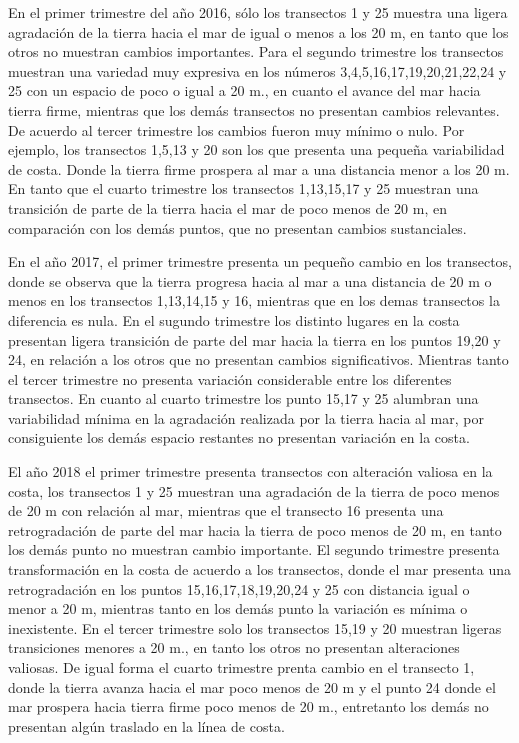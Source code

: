 \documentclass[11pt,]{article}
\begin{document}
En el primer trimestre del año 2016, sólo los transectos 1 y 25 muestra
una ligera agradación de la tierra hacia el mar de igual o menos a los
20 m, en tanto que los otros no muestran cambios importantes. Para el
segundo trimestre los transectos muestran una variedad muy expresiva en
los números 3,4,5,16,17,19,20,21,22,24 y 25 con un espacio de poco o
igual a 20 m., en cuanto el avance del mar hacia tierra firme, mientras
que los demás transectos no presentan cambios relevantes. De acuerdo al
tercer trimestre los cambios fueron muy mínimo o nulo. Por ejemplo, los
transectos 1,5,13 y 20 son los que presenta una pequeña variabilidad de
costa. Donde la tierra firme prospera al mar a una distancia menor a los
20 m. En tanto que el cuarto trimestre los transectos 1,13,15,17 y 25
muestran una transición de parte de la tierra hacia el mar de poco menos
de 20 m, en comparación con los demás puntos, que no presentan cambios
sustanciales.

En el año 2017, el primer trimestre presenta un pequeño cambio en los
transectos, donde se observa que la tierra progresa hacia al mar a una
distancia de 20 m o menos en los transectos 1,13,14,15 y 16, mientras
que en los demas transectos la diferencia es nula. En el sugundo
trimestre los distinto lugares en la costa presentan ligera transición
de parte del mar hacia la tierra en los puntos 19,20 y 24, en relación a
los otros que no presentan cambios significativos. Mientras tanto el
tercer trimestre no presenta variación considerable entre los diferentes
transectos. En cuanto al cuarto trimestre los punto 15,17 y 25 alumbran
una variabilidad mínima en la agradación realizada por la tierra hacia
al mar, por consiguiente los demás espacio restantes no presentan
variación en la costa.

El año 2018 el primer trimestre presenta transectos con alteración
valiosa en la costa, los transectos 1 y 25 muestran una agradación de la
tierra de poco menos de 20 m con relación al mar, mientras que el
transecto 16 presenta una retrogradación de parte del mar hacia la
tierra de poco menos de 20 m, en tanto los demás punto no muestran
cambio importante. El segundo trimestre presenta transformación en la
costa de acuerdo a los transectos, donde el mar presenta una
retrogradación en los puntos 15,16,17,18,19,20,24 y 25 con distancia
igual o menor a 20 m, mientras tanto en los demás punto la variación es
mínima o inexistente. En el tercer trimestre solo los transectos 15,19 y
20 muestran ligeras transiciones menores a 20 m., en tanto los otros no
presentan alteraciones valiosas. De igual forma el cuarto trimestre
prenta cambio en el transecto 1, donde la tierra avanza hacia el mar
poco menos de 20 m y el punto 24 donde el mar prospera hacia tierra
firme poco menos de 20 m., entretanto los demás no presentan algún
traslado en la línea de costa.
\end{document}
